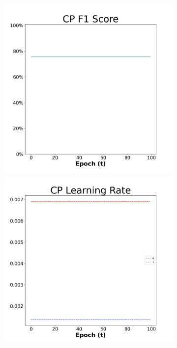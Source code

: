 \begin{figure}[H]
  \centering %
\begin{subfigure}{0.3\textwidth}
\includegraphics[width=\linewidth]{images/exper2/NSP/CP_0.01_f1.png}
  \includegraphics[width=\linewidth]{images/exper2/NSP/CP_0.01_lr.png}

\end{subfigure}
\end{figure}
